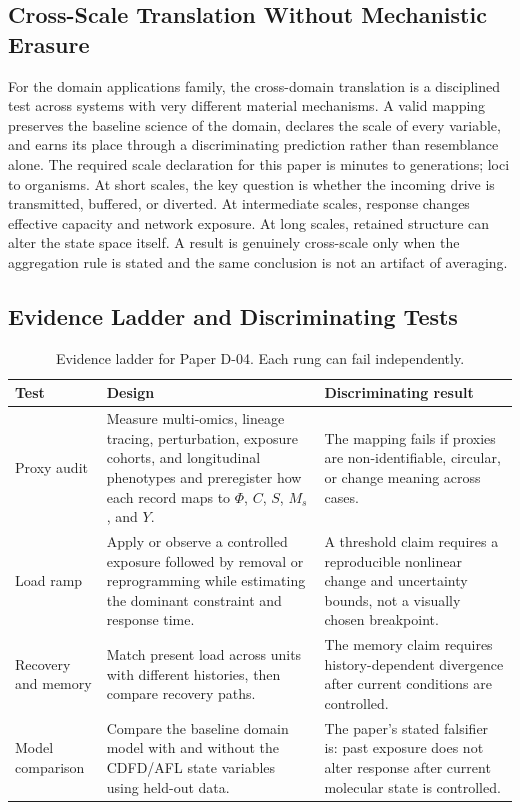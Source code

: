 \documentclass[11pt,a4paper]{article}
\begin{document}
\subsection{Cross-Scale Translation Without Mechanistic Erasure}

For the domain applications family, the cross-domain translation is a disciplined test across systems with very different material mechanisms. A valid mapping preserves the baseline science of the domain, declares the scale of every variable, and earns its place through a discriminating prediction rather than resemblance alone. \cite{Holling1973,Turing1952,Shannon1948,BakTangWiesenfeld1987}
The required scale declaration for this paper is minutes to generations; loci to organisms. At short
scales, the key question is whether the incoming drive is transmitted,
buffered, or diverted. At intermediate scales, response changes effective
capacity and network exposure. At long scales, retained structure can alter the
state space itself. A result is genuinely cross-scale only when the aggregation
rule is stated and the same conclusion is not an artifact of averaging.

\subsection{Evidence Ladder and Discriminating Tests}

\begin{table}[htbp]
\centering
\small
\caption{Evidence ladder for Paper D-04. Each rung can fail independently.}
\begin{tabularx}{\textwidth}{|p{}|X|X|}
\hline
\textbf{Test} & \textbf{Design} & \textbf{Discriminating result} \\
\hline
Proxy audit & Measure multi-omics, lineage tracing, perturbation, exposure cohorts, and longitudinal phenotypes and preregister how each record maps to $\Phi$, $C$, $S$, $M_s$, and $Y$. & The mapping fails if proxies are non-identifiable, circular, or change meaning across cases. \\
\hline
Load ramp & Apply or observe a controlled exposure followed by removal or reprogramming while estimating the dominant constraint and response time. & A threshold claim requires a reproducible nonlinear change and uncertainty bounds, not a visually chosen breakpoint. \\
\hline
Recovery and memory & Match present load across units with different histories, then compare recovery paths. & The memory claim requires history-dependent divergence after current conditions are controlled. \\
\hline
Model comparison & Compare the baseline domain model with and without the CDFD/AFL state variables using held-out data. & The paper's stated falsifier is: past exposure does not alter response after current molecular state is controlled. \\
\hline
\end{tabularx}
\end{table}
\end{document}
